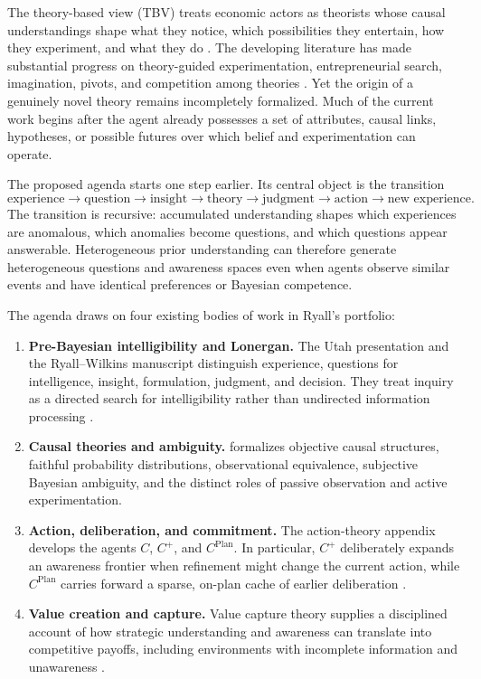 \documentclass[11pt]{article}
\newcommand{\cplan}{C^{\mathrm{Plan}}}
\newcommand{\cplus}{C^{+}}
\begin{document}
	The theory-based view (TBV) treats economic actors as theorists whose causal understandings shape what they notice, which possibilities they entertain, how they experiment, and what they do \citep{FelinZenger2017,FelinGambardellaZenger2024}.  The developing literature has made substantial progress on theory-guided experimentation, entrepreneurial search, imagination, pivots, and competition among theories \citep{CamuffoEtAl2024,ChavdaGansStern2024,EhrigZenger2024,OttHannah2024,RindovaMartins2024,Sorenson2024}.  Yet the origin of a genuinely novel theory remains incompletely formalized.  Much of the current work begins after the agent already possesses a set of attributes, causal links, hypotheses, or possible futures over which belief and experimentation can operate.
	
	The proposed agenda starts one step earlier.  Its central object is the transition
	\begin{equation}
		\label{eq:cycle}
		\text{experience}
		\longrightarrow
		\text{question}
		\longrightarrow
		\text{insight}
		\longrightarrow
		\text{theory}
		\longrightarrow
		\text{judgment}
		\longrightarrow
		\text{action}
		\longrightarrow
		\text{new experience}.
	\end{equation}
	The transition is recursive: accumulated understanding shapes which experiences are anomalous, which anomalies become questions, and which questions appear answerable.  Heterogeneous prior understanding can therefore generate heterogeneous questions and awareness spaces even when agents observe similar events and have identical preferences or Bayesian competence.
	
	The agenda draws on four existing bodies of work in Ryall's portfolio:
	\begin{enumerate}
		\item \textbf{Pre-Bayesian intelligibility and Lonergan.}  The Utah presentation and the Ryall--Wilkins manuscript distinguish experience, questions for intelligence, insight, formulation, judgment, and decision.  They treat inquiry as a directed search for intelligibility rather than undirected information processing \citep{RyallUtah2025,RyallWilkins2018,Lonergan1992}.
		\item \textbf{Causal theories and ambiguity.}  \citet{Ryall2009} formalizes objective causal structures, faithful probability distributions, observational equivalence, subjective Bayesian ambiguity, and the distinct roles of passive observation and active experimentation.
		\item \textbf{Action, deliberation, and commitment.}  The action-theory appendix develops the agents $C$, $\cplus$, and $\cplan$.  In particular, $\cplus$ deliberately expands an awareness frontier when refinement might change the current action, while $\cplan$ carries forward a sparse, on-plan cache of earlier deliberation \citep{RyallAction2026}.
		\item \textbf{Value creation and capture.}  Value capture theory supplies a disciplined account of how strategic understanding and awareness can translate into competitive payoffs, including environments with incomplete information and unawareness \citep{GansRyall2017,BryanRyallSchipper2022}.
	\end{enumerate}
	
\end{document}
